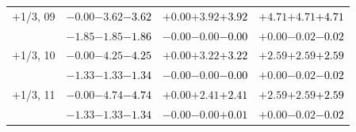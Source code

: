 \documentclass[compress]{beamer}
\begin{document}
\begin{frame}
\begin{tabular}{r | c | c | c}
$+$1/3, 09 & $-0.00$\hspace{0.1 cm}$-3.62$\hspace{0.1 cm}\textcolor{black}{$-3.62$} & $+0.00$\hspace{0.1 cm}$+3.92$\hspace{0.1 cm}\textcolor{black}{$+3.92$} & $+4.71$\hspace{0.1 cm}$+4.71$\hspace{0.1 cm}\textcolor{black}{$+4.71$} \\
           & $-1.85$\hspace{0.1 cm}$-1.85$\hspace{0.1 cm}\textcolor{black}{$-1.86$} & $-0.00$\hspace{0.1 cm}$-0.00$\hspace{0.1 cm}\textcolor{black}{$-0.00$} & $+0.00$\hspace{0.1 cm}$-0.02$\hspace{0.1 cm}\textcolor{black}{$-0.02$} \\
$+$1/3, 10 & $-0.00$\hspace{0.1 cm}$-4.25$\hspace{0.1 cm}\textcolor{black}{$-4.25$} & $+0.00$\hspace{0.1 cm}$+3.22$\hspace{0.1 cm}\textcolor{black}{$+3.22$} & $+2.59$\hspace{0.1 cm}$+2.59$\hspace{0.1 cm}\textcolor{black}{$+2.59$} \\
           & $-1.33$\hspace{0.1 cm}$-1.33$\hspace{0.1 cm}\textcolor{black}{$-1.34$} & $-0.00$\hspace{0.1 cm}$-0.00$\hspace{0.1 cm}\textcolor{black}{$-0.00$} & $+0.00$\hspace{0.1 cm}$-0.02$\hspace{0.1 cm}\textcolor{black}{$-0.02$} \\
$+$1/3, 11 & $-0.00$\hspace{0.1 cm}$-4.74$\hspace{0.1 cm}\textcolor{black}{$-4.74$} & $+0.00$\hspace{0.1 cm}$+2.41$\hspace{0.1 cm}\textcolor{black}{$+2.41$} & $+2.59$\hspace{0.1 cm}$+2.59$\hspace{0.1 cm}\textcolor{black}{$+2.59$} \\
           & $-1.33$\hspace{0.1 cm}$-1.33$\hspace{0.1 cm}\textcolor{black}{$-1.34$} & $-0.00$\hspace{0.1 cm}$-0.00$\hspace{0.1 cm}\textcolor{black}{$+0.01$} & $+0.00$\hspace{0.1 cm}$-0.02$\hspace{0.1 cm}\textcolor{black}{$-0.02$} \\

\end{tabular}
\end{frame}
\end{document}
